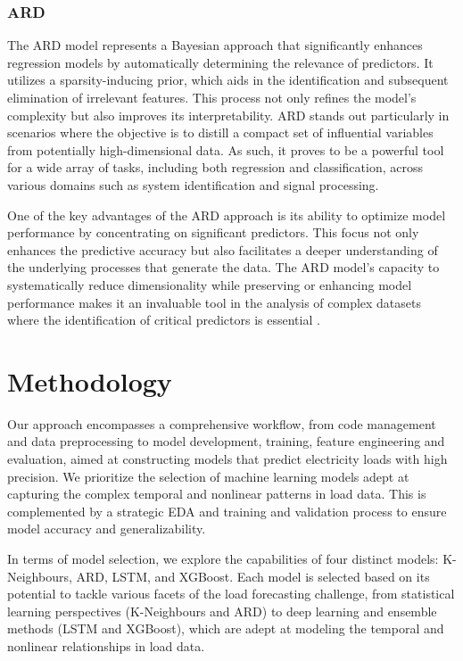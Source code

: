 \documentclass{article} %
\begin{document}
\subsubsection{ARD}
The \gls{ARD} model represents a Bayesian approach that significantly enhances regression models by automatically determining the relevance of predictors. It utilizes a sparsity-inducing prior, which aids in the identification and subsequent elimination of irrelevant features. This process not only refines the model's complexity but also improves its interpretability. \gls{ARD} stands out particularly in scenarios where the objective is to distill a compact set of influential variables from potentially high-dimensional data. As such, it proves to be a powerful tool for a wide array of tasks, including both regression and classification, across various domains such as system identification and signal processing.

One of the key advantages of the \gls{ARD} approach is its ability to optimize model performance by concentrating on significant predictors. This focus not only enhances the predictive accuracy but also facilitates a deeper understanding of the underlying processes that generate the data. The \gls{ARD} model's capacity to systematically reduce dimensionality while preserving or enhancing model performance makes it an invaluable tool in the analysis of complex datasets where the identification of critical predictors is essential \cite{qi2004predictive, rudy2021sparse}.

\section{Methodology}
Our approach encompasses a comprehensive workflow, from code management and data preprocessing to model development, training, feature engineering and evaluation, aimed at constructing models that predict electricity loads with high precision. We prioritize the selection of machine learning models adept at capturing the complex temporal and nonlinear patterns in load data. This is complemented by a strategic \gls{EDA} and training and validation process to ensure model accuracy and generalizability.

In terms of model selection, we explore the capabilities of four distinct models: K-Neighbours, ARD, LSTM, and XGBoost. Each model is selected based on its potential to tackle various facets of the load forecasting challenge, from statistical learning perspectives (K-Neighbours and ARD) to deep learning and ensemble methods (LSTM and XGBoost), which are adept at modeling the temporal and nonlinear relationships in load data. 
\end{document}
